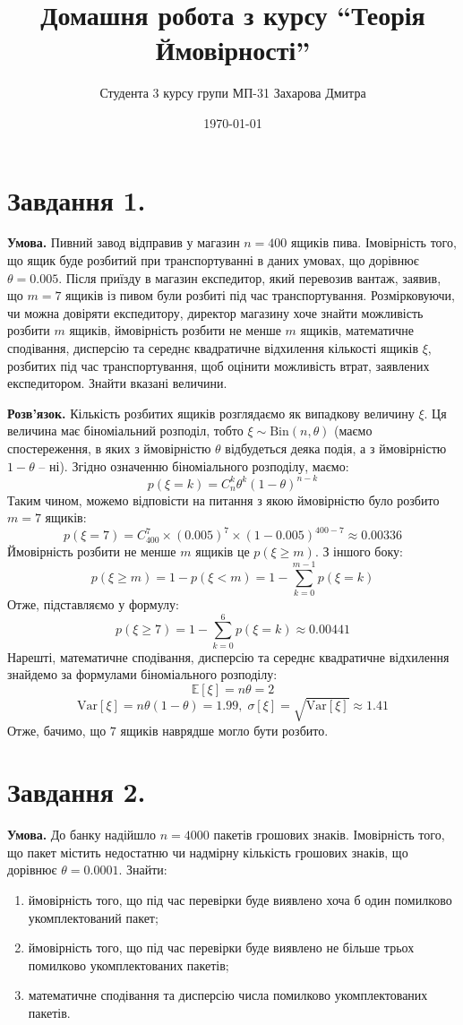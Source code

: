 \documentclass[14pt]{extarticle}
\title{Домашня робота з курсу ``Теорія Ймовірності''}
\author{Студента 3 курсу групи МП-31 Захарова Дмитра}
\date{\today}
\begin{document}
\maketitle

\section*{Завдання 1.} 

\textbf{Умова.} Пивний завод відправив у магазин $n=400$ ящиків пива. Імовірність того, що ящик буде розбитий при транспортуванні в даних умовах, що дорівнює $\theta=0.005$. Після приїзду в магазин експедитор, який перевозив вантаж, заявив, що $m=7$ ящиків із пивом були розбиті під час транспортування. Розмірковуючи, чи можна довіряти експедитору, директор магазину хоче знайти можливість розбити $m$ ящиків, ймовірність розбити не менше $m$ ящиків, математичне сподівання, дисперсію та середнє квадратичне відхилення кількості ящиків $\xi$, розбитих під час транспортування, щоб оцінити можливість втрат, заявлених експедитором. Знайти вказані величини.

\textbf{Розв'язок.} Кількість розбитих ящиків розглядаємо як випадкову величину $\xi$. Ця величина має біноміальний розподіл, тобто $\xi \sim \text{Bin}(n,\theta)$ (маємо спостереження, в яких з ймовірністю $\theta$ відбудеться деяка подія, а з ймовірністю $1-\theta$ -- ні). Згідно означенню біноміального розподілу, маємо:
\[
p(\xi = k) = C_n^k \theta^k (1-\theta)^{n-k}
\]
Таким чином, можемо відповісти на питання з якою ймовірністю було розбито $m=7$ ящиків:
\[
p(\xi = 7) = C_{400}^7 \times (0.005)^7 \times (1-0.005)^{400-7} \approx 0.00336
\]
Ймовірність розбити не менше $m$ ящиків це $p(\xi \geq m)$. З іншого боку:
\[
p(\xi \geq m) = 1 - p(\xi < m) = 1 - \sum_{k=0}^{m-1}p(\xi=k)
\]
Отже, підставляємо у формулу:
\[
p(\xi \geq 7) = 1 - \sum_{k=0}^{6}p(\xi=k) \approx 0.00441
\]
Нарешті, математичне сподівання, дисперсію та середнє квадратичне відхилення знайдемо за формулами біноміального розподілу:
\[
\mathbb{E}[\xi] = n\theta = 2
\]
\[
\text{Var}[\xi] = n\theta(1-\theta) = 1.99, \; \sigma[\xi] = \sqrt{\text{Var}[\xi]} \approx 1.41
\]
Отже, бачимо, що $7$ ящиків наврядше могло бути розбито.

\section*{Завдання 2.}
\textbf{Умова.} До банку надійшло $n=4000$ пакетів грошових знаків. Імовірність того, що пакет містить недостатню чи надмірну кількість грошових знаків, що
дорівнює $\theta=0.0001$. Знайти: 
\begin{enumerate}
    \item ймовірність того, що під час перевірки буде
виявлено хоча б один помилково укомплектований пакет;      \item ймовірність того, що під час перевірки буде виявлено не більше трьох помилково укомплектованих пакетів; 
    \item математичне сподівання та дисперсію числа
помилково укомплектованих пакетів.
\end{enumerate}
\end{document}
